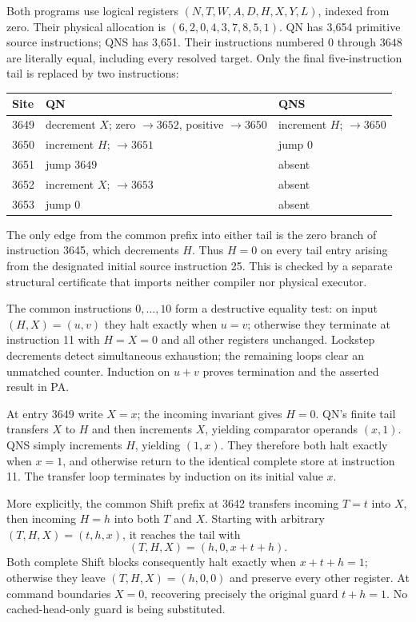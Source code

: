 Both programs use logical registers
$(N,T,W,A,D,H,X,Y,L)$, indexed from zero. Their physical allocation is
$(6,2,0,4,3,7,8,5,1)$. QN has 3,654 primitive source instructions; QNS
has 3,651. Their instructions numbered $0$ through $3648$ are literally
equal, including every resolved target. Only the final five-instruction
tail is replaced by two instructions:
\begin{center}
\begin{tabular}{p{.08\linewidth}p{.43\linewidth}p{.39\linewidth}}
\toprule Site&QN&QNS\\\midrule
3649&decrement $X$; zero $\to3652$, positive $\to3650$&increment $H$; $\to3650$\\
3650&increment $H$; $\to3651$&jump $0$\\
3651&jump $3649$&absent\\
3652&increment $X$; $\to3653$&absent\\
3653&jump $0$&absent\\\bottomrule
\end{tabular}
\end{center}
The only edge from the common prefix into either tail is the zero branch
of instruction 3645, which decrements $H$. Thus $H=0$ on every tail entry
arising from the designated initial source instruction 25. This is checked
by a separate structural certificate that imports neither compiler nor
physical executor.

The common instructions $0,\ldots,10$ form a destructive equality test:
on input $(H,X)=(u,v)$ they halt exactly when $u=v$; otherwise they
terminate at instruction 11 with $H=X=0$ and all other registers
unchanged. Lockstep decrements detect simultaneous exhaustion; the
remaining loops clear an unmatched counter. Induction on $u+v$ proves
termination and the asserted result in PA.

At entry 3649 write $X=x$; the incoming invariant gives $H=0$. QN's
finite tail transfers $X$ to $H$ and then increments $X$, yielding
comparator operands $(x,1)$. QNS simply increments $H$, yielding
$(1,x)$. They therefore both halt exactly when $x=1$, and otherwise
return to the identical complete store at instruction 11. The transfer
loop terminates by induction on its initial value $x$.

More explicitly, the common Shift prefix at 3642 transfers incoming
$T=t$ into $X$, then incoming $H=h$ into both $T$ and $X$. Starting with
arbitrary $(T,H,X)=(t,h,x)$, it reaches the tail with
\[
 (T,H,X)=(h,0,x+t+h).
\]
Both complete Shift blocks consequently halt exactly when $x+t+h=1$;
otherwise they leave $(T,H,X)=(h,0,0)$ and preserve every other register.
At command boundaries $X=0$, recovering precisely the original guard
$t+h=1$. No cached-head-only guard is being substituted.

